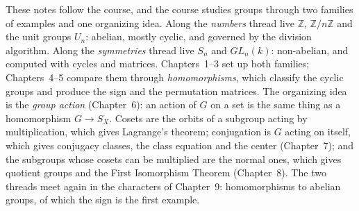 \documentclass[11pt]{report}
\begin{document}
These notes follow the course, and the course studies groups through two families of examples and one organizing idea. Along the \emph{numbers} thread live $\mathbb{Z}$, $\mathbb{Z}/n\mathbb{Z}$ and the unit groups $U_n$: abelian, mostly cyclic, and governed by the division algorithm. Along the \emph{symmetries} thread live $S_n$ and $GL_n(k)$: non-abelian, and computed with cycles and matrices. Chapters~1--3 set up both families; Chapters~4--5 compare them through \emph{homomorphisms}, which classify the cyclic groups and produce the sign and the permutation matrices. The organizing idea is the \emph{group action} (Chapter~6): an action of $G$ on a set is the same thing as a homomorphism $G \to S_X$. Cosets are the orbits of a subgroup acting by multiplication, which gives Lagrange's theorem; conjugation is $G$ acting on itself, which gives conjugacy classes, the class equation and the center (Chapter~7); and the subgroups whose cosets can be multiplied are the normal ones, which gives quotient groups and the First Isomorphism Theorem (Chapter~8). The two threads meet again in the characters of Chapter~9: homomorphisms to abelian groups, of which the sign is the first example.
\end{document}
